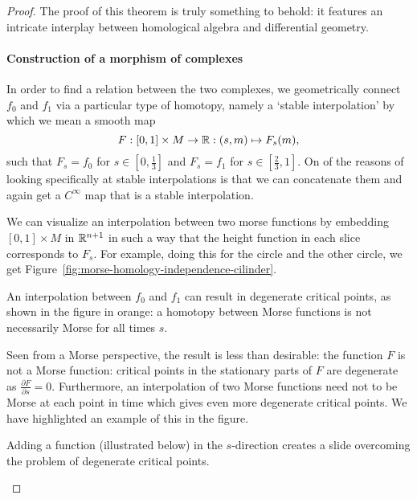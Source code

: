 \begin{proof}
The proof of this theorem is truly something to behold: it features an intricate interplay between homological algebra and differential geometry.
\paragraph{Construction of a morphism of complexes}
In order to find a relation between the two complexes, we geometrically connect $f_0$ and $f_1$ via a particular type of homotopy, namely  a `stable interpolation' by which we mean a smooth map
\[
    F: [0,1] \times M \to \mathbb{R}: (s, m) \mapsto F_s(m)
,\] 
such that $F_s = f_0$ for $s \in \left[0, \frac{1}{3}\right]$ and $F_s = f_1$ for $s \in \left[\frac{2}{3}, 1\right]$.
On of the reasons of looking specifically at stable interpolations is that we can concatenate them and again get a $C^{\infty}$ map that is a stable interpolation.

We can visualize an interpolation between two morse functions by embedding $[0,1] \times M$ in $\mathbb{R}^{n+1}$ in such a way that the height function in each slice corresponds to $F_s$.
For example, doing this for the circle and the other circle, we get Figure~\ref{fig:morse-homology-independence-cilinder}.

\begin{marginfigure}
    \centering
    \caption{An interpolation between $f_0$ and $f_1$ can result in degenerate critical points, as shown in the figure in orange:
        a homotopy between Morse functions is not necessarily Morse for all times $s$.
    }
    \label{fig:morse-homology-independence-cilinder}
\end{marginfigure}

Seen from a Morse perspective, the result is less than desirable: the function $F$ is not a Morse function: critical points in the stationary parts of $F$ are degenerate as $\frac{\partial F}{\partial s} = 0$.
Furthermore, an interpolation of two Morse functions need not to be Morse at each point in time which gives even more degenerate critical points. We have highlighted an example of this in the figure.

\begin{marginfigure}
    \centering
    \caption{Adding a function (illustrated below) in the $s$-direction creates a slide overcoming the problem of degenerate critical points.}
    \label{fig:morse-homology-independence-tube}
\end{marginfigure}


\end{proof}
